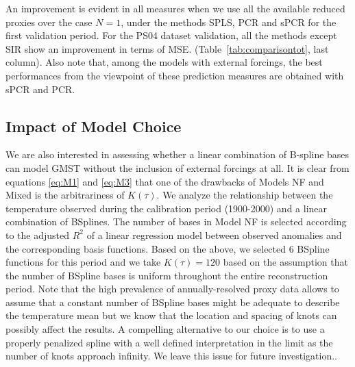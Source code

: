 \documentclass[12pt]{amsart}
\theoremstyle{plain}
\theoremstyle{definition}
\theoremstyle{remark}
\newcommand{\lb}[1]{\color{MidnightBlue}\textbf{[LB: #1]}\normalcolor}
\newcommand{\jeg}[1]{\color{ProcessBlue}\textbf{[JEG: #1]}\normalcolor}
\begin{document}
An improvement is evident in all measures when we use all the available reduced proxies over the case
$N=1$, under the methods SPLS, PCR and sPCR for the first validation period.
For the PS04 dataset validation, all the methods except SIR show an improvement in terms of MSE. (Table~\ref{tab:comparisontot}, last column). Also note that, among the models with external forcings, the best performances from the viewpoint of these prediction measures are obtained with sPCR and PCR.

\subsection{Impact of Model Choice}
We are also interested in assessing whether a linear combination of B-spline bases can model GMST without the inclusion of external
forcings at all. It is clear from equations \eqref{eq:M1} and \eqref{eq:M3} that
one of the drawbacks of Models NF and Mixed is the arbitrariness of $K(\tau)$. We analyze the
relationship between the temperature observed during the calibration period
(1900-2000) and a linear combination of BSplines. The number of 
bases in Model NF is selected according to the adjusted $R^2$ of a linear regression model between observed anomalies and
the corresponding basis functions. Based on the above, we selected 6
BSpline functions for this period and we take $K(\tau)=120$ based on the
assumption that the number of BSpline bases is uniform
throughout the entire reconstruction period. Note that the high prevalence of
annually-resolved proxy data allows to assume that a constant number of BSpline bases might be adequate to describe the temperature
mean but we know that the location and spacing of knots can possibly affect the results.  A compelling alternative to our choice is to use a properly penalized spline with a well
defined interpretation in the limit as the number of knots approach infinity. We leave this issue for future investigation..%
  
\end{document}
